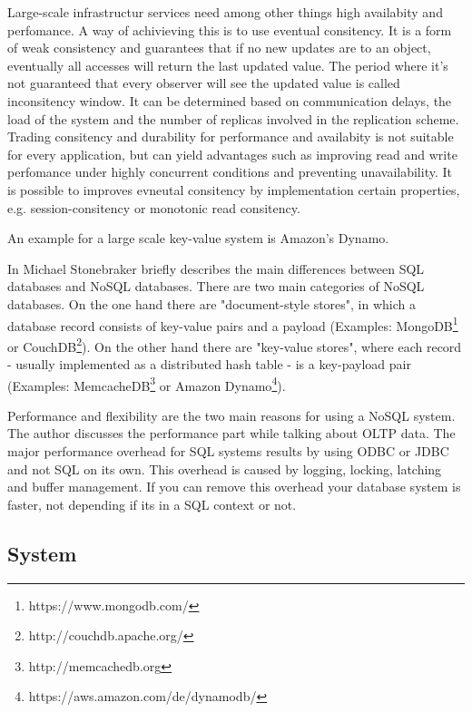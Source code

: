 \begin{packed_enum}
\item 
Large-scale infrastructur services need among other things high availabity and perfomance. A way of achivieving this is to use eventual consitency. It is a form of weak consistency and guarantees that if no new updates are to an object, eventually all accesses will return the last updated value. The period where it's not guaranteed that every observer will see the updated value is called inconsitency window. It can be determined based on communication delays, the load of the system and the number of replicas involved in the replication scheme.  
Trading consitency and durability for performance and availabity is not suitable for every application, but can yield advantages such as improving read and write perfomance under highly concurrent conditions and preventing unavailability. It is possible to improves evneutal consitency 
by implementation certain properties, e.g. session-consitency or monotonic read consitency. 

An example for a large scale key-value system is Amazon's Dynamo. \cite{Vogels2009}

\item
In \cite{Stonebraker2010} Michael Stonebraker briefly describes the main differences between SQL databases and NoSQL databases. There are two main categories of NoSQL databases. On the one hand there are "document-style stores", in which a database record consists of key-value pairs and a payload (Examples: MongoDB\footnote{https://www.mongodb.com/} or CouchDB\footnote{http://couchdb.apache.org/}). On the other hand there are "key-value stores", where each record - usually implemented as a distributed hash table - is a key-payload pair (Examples: MemcacheDB\footnote{http://memcachedb.org} or Amazon Dynamo\footnote{https://aws.amazon.com/de/dynamodb/}).

Performance and flexibility are the two main reasons for using a NoSQL system. The author discusses the performance part while talking about OLTP data. The major performance overhead for SQL systems results by using ODBC or JDBC and not SQL on its own. This overhead is caused by logging, locking, latching and buffer management. If you can remove this overhead your database system is faster, not depending if its in a SQL context or not.


\end{packed_enum}

\subsection{System}

